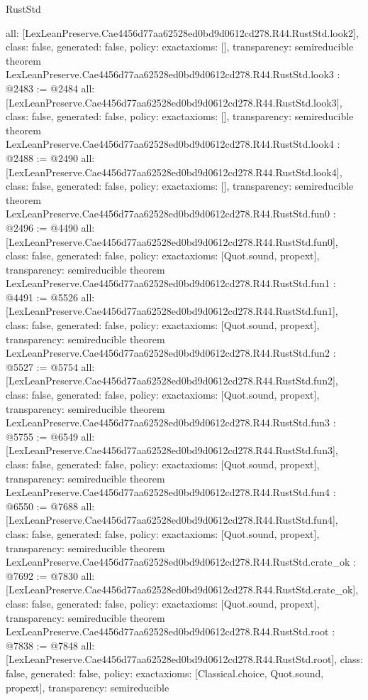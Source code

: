 \begin{lexlean}{RustStd}
\begin{coremodule}
{  all: [LexLeanPreserve.Cae4456d77aa62528ed0bd9d0612cd278.R44.RustStd.look2],
  class: false,
  generated: false,
  policy: exact{axioms: []},
  transparency: semireducible
}
theorem LexLeanPreserve.Cae4456d77aa62528ed0bd9d0612cd278.R44.RustStd.look3 : @2483 := @2484 {
  all: [LexLeanPreserve.Cae4456d77aa62528ed0bd9d0612cd278.R44.RustStd.look3],
  class: false,
  generated: false,
  policy: exact{axioms: []},
  transparency: semireducible
}
theorem LexLeanPreserve.Cae4456d77aa62528ed0bd9d0612cd278.R44.RustStd.look4 : @2488 := @2490 {
  all: [LexLeanPreserve.Cae4456d77aa62528ed0bd9d0612cd278.R44.RustStd.look4],
  class: false,
  generated: false,
  policy: exact{axioms: []},
  transparency: semireducible
}
theorem LexLeanPreserve.Cae4456d77aa62528ed0bd9d0612cd278.R44.RustStd.fun0 : @2496 := @4490 {
  all: [LexLeanPreserve.Cae4456d77aa62528ed0bd9d0612cd278.R44.RustStd.fun0],
  class: false,
  generated: false,
  policy: exact{axioms: [Quot.sound, propext]},
  transparency: semireducible
}
theorem LexLeanPreserve.Cae4456d77aa62528ed0bd9d0612cd278.R44.RustStd.fun1 : @4491 := @5526 {
  all: [LexLeanPreserve.Cae4456d77aa62528ed0bd9d0612cd278.R44.RustStd.fun1],
  class: false,
  generated: false,
  policy: exact{axioms: [Quot.sound, propext]},
  transparency: semireducible
}
theorem LexLeanPreserve.Cae4456d77aa62528ed0bd9d0612cd278.R44.RustStd.fun2 : @5527 := @5754 {
  all: [LexLeanPreserve.Cae4456d77aa62528ed0bd9d0612cd278.R44.RustStd.fun2],
  class: false,
  generated: false,
  policy: exact{axioms: [Quot.sound, propext]},
  transparency: semireducible
}
theorem LexLeanPreserve.Cae4456d77aa62528ed0bd9d0612cd278.R44.RustStd.fun3 : @5755 := @6549 {
  all: [LexLeanPreserve.Cae4456d77aa62528ed0bd9d0612cd278.R44.RustStd.fun3],
  class: false,
  generated: false,
  policy: exact{axioms: [Quot.sound, propext]},
  transparency: semireducible
}
theorem LexLeanPreserve.Cae4456d77aa62528ed0bd9d0612cd278.R44.RustStd.fun4 : @6550 := @7688 {
  all: [LexLeanPreserve.Cae4456d77aa62528ed0bd9d0612cd278.R44.RustStd.fun4],
  class: false,
  generated: false,
  policy: exact{axioms: [Quot.sound, propext]},
  transparency: semireducible
}
theorem LexLeanPreserve.Cae4456d77aa62528ed0bd9d0612cd278.R44.RustStd.crate_ok : @7692 := @7830 {
  all: [LexLeanPreserve.Cae4456d77aa62528ed0bd9d0612cd278.R44.RustStd.crate_ok],
  class: false,
  generated: false,
  policy: exact{axioms: [Quot.sound, propext]},
  transparency: semireducible
}
theorem LexLeanPreserve.Cae4456d77aa62528ed0bd9d0612cd278.R44.RustStd.root : @7838 := @7848 {
  all: [LexLeanPreserve.Cae4456d77aa62528ed0bd9d0612cd278.R44.RustStd.root],
  class: false,
  generated: false,
  policy: exact{axioms: [Classical.choice, Quot.sound, propext]},
  transparency: semireducible
}


\end{coremodule}
\end{lexlean}
